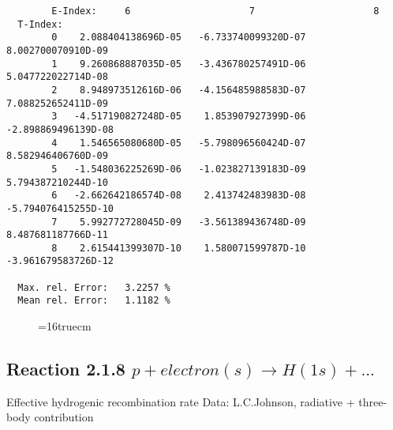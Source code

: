 \documentclass[12pt]{article}
\begin{document}
\begin{small}
\begin{verbatim}
        E-Index:     6                     7                     8
  T-Index:
        0    2.088404138696D-05   -6.733740099320D-07    8.002700070910D-09
        1    9.260868887035D-05   -3.436780257491D-06    5.047722022714D-08
        2    8.948973512616D-06   -4.156485988583D-07    7.088252652411D-09
        3   -4.517190827248D-05    1.853907927399D-06   -2.898869496139D-08
        4    1.546565080680D-05   -5.798096560424D-07    8.582946406760D-09
        5   -1.548036225269D-06   -1.023827139183D-09    5.794387210244D-10
        6   -2.662642186574D-08    2.413742483983D-08   -5.794076415255D-10
        7    5.992772728045D-09   -3.561389436748D-09    8.487681187766D-11
        8    2.615441399307D-10    1.580071599787D-10   -3.961679583726D-12

  Max. rel. Error:   3.2257 %
  Mean rel. Error:   1.1182 %

\end{verbatim}\end{small}
\begin{figure} \label{2.1.5FU}
\epsfxsize=16truecm
\end{figure}
\newpage


\subsection{
  Reaction 2.1.8  $ p + electron(s) \rightarrow H(1s) + ...$
}

   Effective hydrogenic recombination rate
   Data: L.C.Johnson, radiative + three-body contribution
\end{document}
